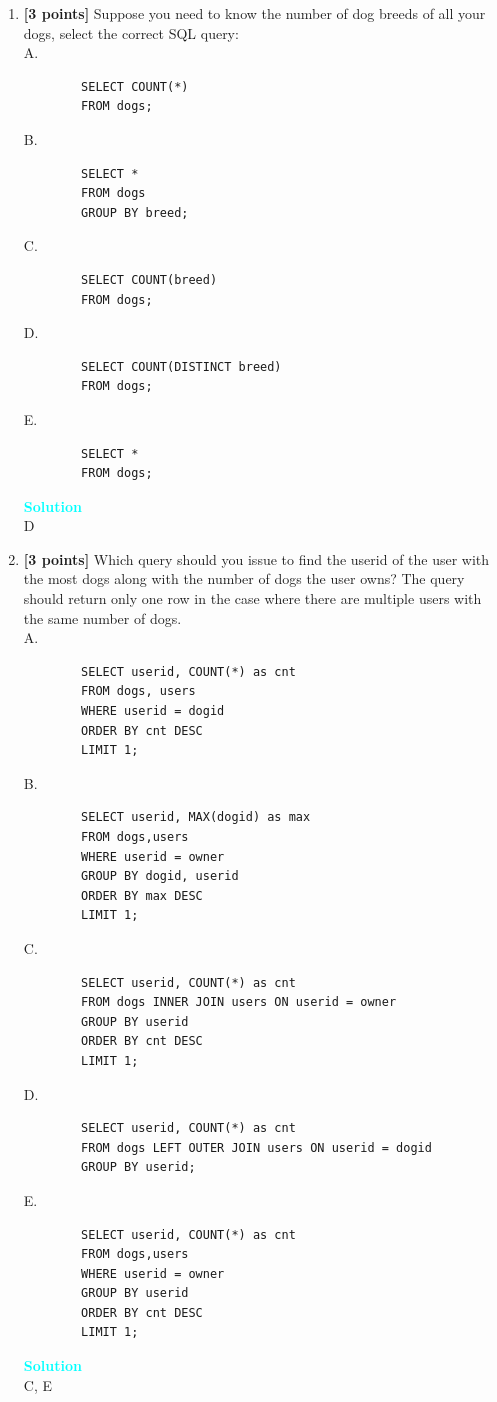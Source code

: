 \documentclass[10pt]{article}
\newenvironment{solution}
    { \begin{mdframed}[backgroundcolor=gray!10] \textcolor{cyan}{\textbf{Solution}} \\}
    {  \end{mdframed}}
\begin{document}
\begin{enumerate}
  \item \textbf{[3 points]}
   Suppose you need to know the number of dog breeds of all your dogs, select the correct SQL query:\\
    A.
	\begin{lstlisting} 
		SELECT COUNT(*) 
		FROM dogs;
	\end{lstlisting}
    B. 
	\begin{lstlisting}
		SELECT * 
		FROM dogs 
		GROUP BY breed;
	\end{lstlisting}
    C. 
	\begin{lstlisting}
		SELECT COUNT(breed) 
		FROM dogs;
	\end{lstlisting}
    D. 
	\begin{lstlisting}
		SELECT COUNT(DISTINCT breed) 
		FROM dogs;
	\end{lstlisting}
    E. 
	\begin{lstlisting}
		SELECT * 
		FROM dogs;
	\end{lstlisting}
	\begin{solution}
   D
	\end{solution}
    
  \item \textbf{[3 points]}
    Which query	should you issue to find the userid of the user with the most dogs along with the number of dogs the user owns? 
	The query should return only one row in the case where there are multiple users	with the same number of dogs. \\
    A. 
	\begin{lstlisting}
        SELECT userid, COUNT(*) as cnt
        FROM dogs, users
        WHERE userid = dogid
        ORDER BY cnt DESC
        LIMIT 1;
    \end{lstlisting}
	B.
    \begin{lstlisting}
        SELECT userid, MAX(dogid) as max
        FROM dogs,users
        WHERE userid = owner
        GROUP BY dogid, userid
        ORDER BY max DESC
        LIMIT 1;
    \end{lstlisting}
	C.
    \begin{lstlisting}
        SELECT userid, COUNT(*) as cnt
        FROM dogs INNER JOIN users ON userid = owner
        GROUP BY userid
        ORDER BY cnt DESC
        LIMIT 1;
    \end{lstlisting}
	D.
    \begin{lstlisting}
        SELECT userid, COUNT(*) as cnt
        FROM dogs LEFT OUTER JOIN users ON userid = dogid
        GROUP BY userid;
    \end{lstlisting}
	E.
    \begin{lstlisting}
        SELECT userid, COUNT(*) as cnt
        FROM dogs,users
        WHERE userid = owner
        GROUP BY userid
        ORDER BY cnt DESC
        LIMIT 1;
    \end{lstlisting}
	\begin{solution}
		C, E
	\end{solution}
    

\end{enumerate}
\end{document}
